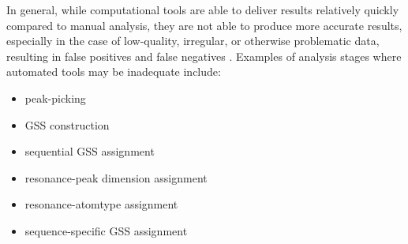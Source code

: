 In general, while computational tools are able to deliver results relatively 
quickly compared to manual analysis, they are not able to produce more 
accurate results, especially in the case of low-quality, irregular, or 
otherwise problematic data, resulting in false positives and false 
negatives \cite{williamson2009automated}.  
Examples of analysis stages where automated tools may be inadequate include:
\begin{itemize}
 \item peak-picking
 \item GSS construction
 \item sequential GSS assignment
 \item resonance-peak dimension assignment
 \item resonance-atomtype assignment
 \item sequence-specific GSS assignment
\end{itemize}

